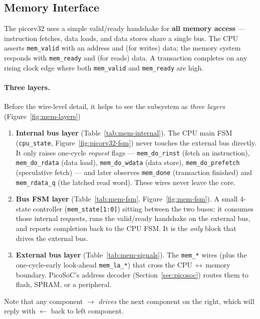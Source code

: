 \documentclass[9pt, a4paper]{extarticle}
\begin{document}
\clearpage

\subsection{Memory Interface}

The picorv32 uses a simple valid/ready handshake for \textbf{all memory access} --- instruction fetches, data loads, and data stores share a single bus. The CPU asserts \texttt{mem\_valid} with an address and (for writes) data; the memory system responds with \texttt{mem\_ready} and (for reads) data. A transaction completes on any rising clock edge where both \texttt{mem\_valid} and \texttt{mem\_ready} are high.

\paragraph{Three layers.} Before the wire-level detail, it helps to see the subsystem as \emph{three layers} (Figure~\ref{fig:mem-layers})

\begin{enumerate}
    \item \textbf{Internal bus layer} (Table~\ref{tab:mem-internal}). The CPU main FSM (\texttt{cpu\_state}, Figure~\ref{fig:picorv32-fsm}) never touches the external bus directly. It only raises one-cycle \emph{request} flags --- \texttt{mem\_do\_rinst} (fetch an instruction), \texttt{mem\_do\_rdata} (data load), \texttt{mem\_do\_wdata} (data store), \texttt{mem\_do\_prefetch} (speculative fetch) --- and later observes \texttt{mem\_done} (transaction finished) and \texttt{mem\_rdata\_q} (the latched read word). These wires never leave the core.
    \item \textbf{Bus FSM layer} (Table~\ref{tab:mem-fsm}, Figure~\ref{fig:mem-fsm}). A small 4-state controller (\texttt{mem\_state[1:0]}) sitting between the two buses: it consumes those internal requests, runs the valid/ready handshake on the external bus, and reports completion back to the CPU FSM. It is the \emph{only} block that drives the external bus.
    \item \textbf{External bus layer} (Table~\ref{tab:mem-signals}). The \texttt{mem\_*} wires (plus the one-cycle-early look-ahead \texttt{mem\_la\_*}) that cross the CPU\,$\leftrightarrow$\,memory boundary. PicoSoC's address decoder (Section~\ref{sec:picosoc}) routes them to flash, SPRAM, or a peripheral.
\end{enumerate}

Note that any component $\to$ \textit{drives} the next component on the right, which will reply with $\gets$ back to left component.
\end{document}
